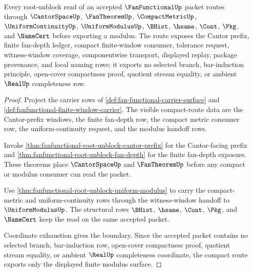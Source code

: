 \begin{theorem}
\label{thm:fanfunctional-root-unblock-compact-route}
Every root-unblock read of an accepted $\FanFunctionalUp$ packet routes through $\CantorSpaceUp$, $\FanTheoremUp$, $\CompactMetricUp$, $\UniformContinuityUp$, $\UniformModulusUp$, $\BHist$, $\hsame$, $\Cont$, $\Pkg$, and $\NameCert$ before exporting a modulus. The route exposes the Cantor prefix, finite fan-depth ledger, compact finite-window consumer, tolerance request, witness-window coverage, componentwise transport, displayed replay, package provenance, and local naming rows; it exports no selected branch, bar-induction principle, open-cover compactness proof, quotient stream equality, or ambient $\RealUp$ completeness row.
\end{theorem}
\begin{proof}
Project the carrier rows of \autoref{def:fan-functional-carrier-surface} and \autoref{def:fanfunctional-finite-window-carrier}. The visible compact-route data are the Cantor-prefix windows, the finite fan-depth row, the compact metric consumer row, the uniform-continuity request, and the modulus handoff rows.

Invoke \autoref{thm:fanfunctional-root-unblock-cantor-prefix} for the Cantor-facing prefix and \autoref{thm:fanfunctional-root-unblock-fan-depth} for the finite fan-depth exposure. These theorems place $\CantorSpaceUp$ and $\FanTheoremUp$ before any compact or modulus consumer can read the packet.

Use \autoref{thm:fanfunctional-root-unblock-uniform-modulus} to carry the compact-metric and uniform-continuity rows through the witness-window handoff to $\UniformModulusUp$. The structural rows $\BHist$, $\hsame$, $\Cont$, $\Pkg$, and $\NameCert$ keep the read on the same accepted packet.

Coordinate exhaustion gives the boundary. Since the accepted packet contains no selected branch, bar-induction row, open-cover compactness proof, quotient stream equality, or ambient $\RealUp$ completeness coordinate, the compact route exports only the displayed finite modulus surface.
\end{proof}

